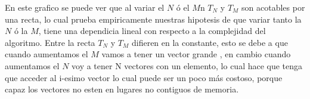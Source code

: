     
     \begin{figure}[H]
         \centering
         \caption{}
         \label{fig:exp1:tiempo_base}
     \end{figure}

     En este grafico se puede ver que al variar el $N$ ó el $M$n $T_N$ y $T_M$ son acotables por una recta, lo cual prueba empiricamente nuestras hipotesis de que variar tanto la $N$ ó la $M$, tiene una dependicia lineal con respecto a la complejidad del algoritmo. Entre la recta $T_N$ y $T_M$ difieren en la constante, esto se debe a que cuando aumentamos el $M$ vamos a tener un vector grande , en cambio cuando aumentamos el $N$ voy a tener N vectores con un elemento, lo cual hace que tenga que acceder al i-esimo vector lo cual puede ser un poco más costoso, porque capaz los vectores no esten en lugares no contiguos de memoria. 


